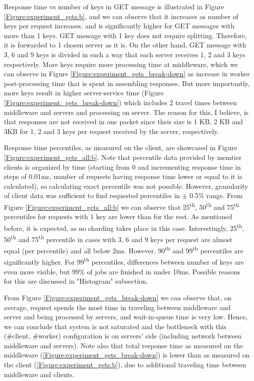 \documentclass[11pt,a4paper]{article}
\begin{document}
Response time vs number of keys in GET message is illustrated in Figure \ref{Figure:experiment_gets:b}, and we can observe that it increases as number of keys per request increases, and is significantly higher for GET messages with more than 1 keys. GET message with 1 key does not require splitting. Therefore, it is forwarded to 1 chosen server as it is. On the other hand, GET message with 3, 6 and 9 keys is divided in such a way that each server receives 1, 2 and 3 keys respectively. More keys require more processing time at middleware, which we can observe in Figure \ref{Figure:experiment_gets_break-down} as increase in worker post-processing time that is spent in assembling responses. But more importantly, more keys result in higher server-service time (Figure \ref{Figure:experiment_gets_break-down}) which includes 2 travel times between middleware and servers and processing on server. The reason for this, I believe, is that responses are not received in one packet since their size is 1 KB, 2 KB and 3KB for 1, 2 and 3 keys per request received by the server, respectively.

Response time percentiles, as measured on the client, are showcased in Figure \ref{Figure:experiment_gets_all:b}. Note that percentile data provided by memtier clients is organized by time (starting from 0 and incrementing response time in steps of 0.01ms, number of requests having response time lower or equal to it is calculated), so calculating exact percentile was not possible. However, granularity of client data was sufficient to find requested percentiles in $\pm$ 0.5\% range. From Figure \ref{Figure:experiment_gets_all:b} we can observe that 25\textsuperscript{th}, 50\textsuperscript{th} and 75\textsuperscript{th} percentiles for requests with 1 key are lower than for the rest. As mentioned before, it is expected, as no sharding takes place in this case. Interestingly, 25\textsuperscript{th}, 50\textsuperscript{th} and 75\textsuperscript{th} percentile in cases with 3, 6 and 9 keys per request are almost equal (per percentile) and all below 2ms. However, 90\textsuperscript{th} and 99\textsuperscript{th} percentiles are significantly higher. For 99\textsuperscript{th} percentiles, differences between number of keys are even more visible, but 99\% of jobs are finished in under 10ms. Possible reasons for this are discussed in "Histogram" subsection.

From Figure \ref{Figure:experiment_gets_break-down} we can observe that, on average, request spends the most time in traveling between middleware and server and being processed by servers, and wait-in-queue time is very low. Hence, we can conclude that system is not saturated and the bottleneck with this (\#client, \#worker) configuration is on servers' side (including network between middleware and servers). Note also that total response time as measured on the middleware (\ref{Figure:experiment_gets_break-down}) is lower than as measured on the client (\ref{Figure:experiment_gets:b}), due to additional traveling time between middleware and clients.
\end{document}
